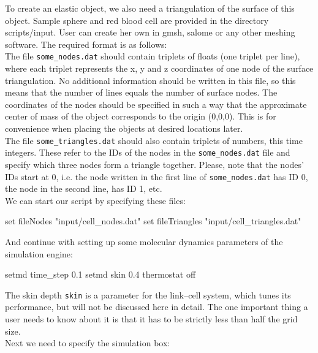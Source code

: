 \documentclass[
a4paper,                        %
11pt,                           %
twoside,                        %
footsepline,                    %
headsepline,                    %
headexclude,                    %
footexclude,                    %
pagesize,                       %
]{scrartcl}
\begin{document}
To create an elastic object, we also need a triangulation of the surface of this object. Sample sphere and red blood cell are provided in the directory scripts/input. User can create her own in gmsh, salome or any other meshing software. The required format is as follows:\\

The file \verb|some_nodes.dat| should contain triplets of floats (one triplet per line), where each triplet represents the x, y and z coordinates of one node of the surface triangulation. No additional information should be written in this file, so this means that the number of lines equals the number of surface nodes. The coordinates of the nodes should be specified in such a way that the approximate center of mass of the object corresponds to the origin (0,0,0). This is for convenience when placing the objects at desired locations later.\\

The file \verb|some_triangles.dat| should also contain triplets of numbers, this time integers. These refer to the IDs of the nodes in the \verb|some_nodes.dat| file and specify which three nodes form a triangle together. Please, note that the nodes' IDs start at 0, i.e. the node written in the first line of \verb|some_nodes.dat| has ID 0, the node in the second line, has ID 1, etc.\\     

We can start our script by specifying these files:\\
\begin{tclcode}
  set fileNodes  "input/cell_nodes.dat"
  set fileTriangles "input/cell_triangles.dat"
\end{tclcode}
\vspace{0 mm}

And continue with setting up some molecular dynamics parameters of the simulation engine:\\
\begin{tclcode}
  setmd time_step 0.1    
  setmd skin 0.4
  thermostat off
\end{tclcode}
\vspace{0 mm}

The skin depth \verb|skin| is a parameter for the link--cell system, which tunes its performance, but will not be discussed here in detail. The one important thing a user needs to know about it is that it has to be strictly less than half the grid size.\\

Next we need to specify the simulation box:\\
\vspace{0 mm}
\end{document}
